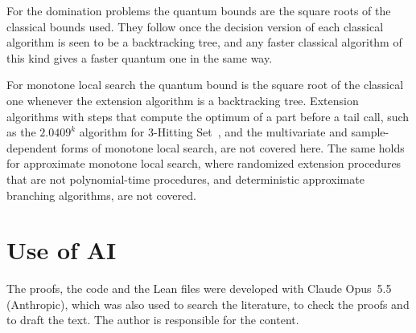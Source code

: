 \documentclass[11pt]{article}
\theoremstyle{remark}
\begin{document}
For the domination problems the quantum bounds are the square roots of the classical bounds used. They follow once the decision version of each classical algorithm is seen to be a backtracking tree, and any faster classical algorithm of this kind gives a faster quantum one in the same way.

For monotone local search the quantum bound is the square root of the classical one whenever the extension algorithm is a backtracking tree. Extension algorithms with steps that compute the optimum of a part before a tail call, such as the $2.0409^k$ algorithm for 3-Hitting Set~\cite{Tsu25}, and the multivariate and sample-dependent forms of monotone local search, are not covered here. The same holds for approximate monotone local search, where randomized extension procedures that are not polynomial-time procedures, and deterministic approximate branching algorithms, are not covered.

\section*{Use of AI}

The proofs, the code and the Lean files were developed with Claude Opus~5.5 (Anthropic), which was also used to search the literature, to check the proofs and to draft the text. The author is responsible for the content.
\end{document}
